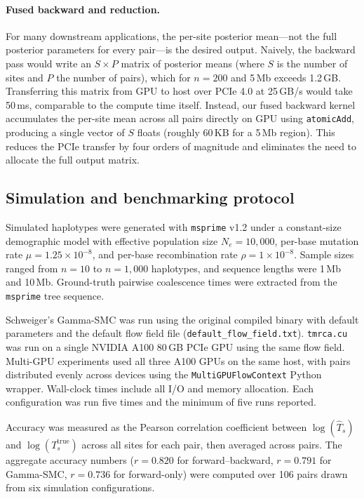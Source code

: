 \documentclass[10pt,letterpaper]{article}
\begin{document}
\paragraph{Fused backward and reduction.}
For many downstream applications, the per-site posterior mean---not the full posterior parameters for every pair---is the desired output.
Naively, the backward pass would write an $S \times P$ matrix of posterior means (where $S$ is the number of sites and $P$ the number of pairs), which for $n=200$ and 5\,Mb exceeds 1.2\,GB.
Transferring this matrix from GPU to host over PCIe 4.0 at 25\,GB/s would take 50\,ms, comparable to the compute time itself.
Instead, our fused backward kernel accumulates the per-site mean across all pairs directly on GPU using \texttt{atomicAdd}, producing a single vector of $S$ floats (roughly 60\,KB for a 5\,Mb region).
This reduces the PCIe transfer by four orders of magnitude and eliminates the need to allocate the full output matrix.

\subsection*{Simulation and benchmarking protocol}

Simulated haplotypes were generated with \texttt{msprime} v1.2 \cite{Baumdicker2022} under a constant-size demographic model with effective population size $N_e = 10{,}000$, per-base mutation rate $\mu = 1.25 \times 10^{-8}$, and per-base recombination rate $\rho = 1 \times 10^{-8}$.
Sample sizes ranged from $n=10$ to $n=1{,}000$ haplotypes, and sequence lengths were 1\,Mb and 10\,Mb.
Ground-truth pairwise coalescence times were extracted from the \texttt{msprime} tree sequence.

Schweiger's Gamma-SMC was run using the original compiled binary with default parameters and the default flow field file (\texttt{default\_flow\_field.txt}).
\texttt{tmrca.cu} was run on a single NVIDIA A100 80\,GB PCIe GPU using the same flow field.  Multi-GPU experiments used all three A100 GPUs on the same host, with pairs distributed evenly across devices using the \texttt{MultiGPUFlowContext} Python wrapper.
Wall-clock times include all I/O and memory allocation.
Each configuration was run five times and the minimum of five runs reported.

Accuracy was measured as the Pearson correlation coefficient between $\log(\hat{T}_s)$ and $\log(T_s^{\text{true}})$ across all sites for each pair, then averaged across pairs.
The aggregate accuracy numbers ($r = 0.820$ for forward--backward, $r = 0.791$ for Gamma-SMC, $r = 0.736$ for forward-only) were computed over 106 pairs drawn from six simulation configurations.
\end{document}
